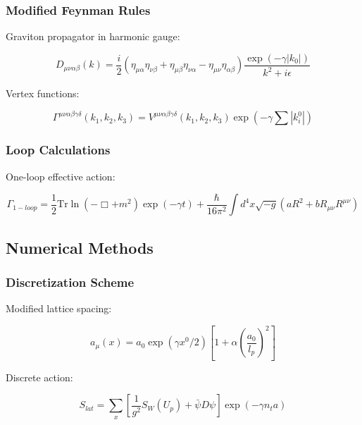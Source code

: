 \documentclass[12pt]{article}
\theoremstyle{plain}
\theoremstyle{definition}
\theoremstyle{remark}
\begin{document}
\subsubsection{Modified Feynman Rules}

Graviton propagator in harmonic gauge:

\begin{equation}
D_{\mu\nu\alpha\beta}(k) = \frac{i}{2}\left(\eta_{\mu\alpha}\eta_{\nu\beta} + \eta_{\mu\beta}\eta_{\nu\alpha} - \eta_{\mu\nu}\eta_{\alpha\beta}\right)\frac{\exp(-\gamma|k_0|)}{k^2 + i\epsilon}
\end{equation}

Vertex functions:

\begin{equation}
\Gamma^{\mu\nu\alpha\beta\gamma\delta}(k_1,k_2,k_3) = V^{\mu\nu\alpha\beta\gamma\delta}(k_1,k_2,k_3)\exp(-\gamma\sum|k_i^0|)
\end{equation}

\subsubsection{Loop Calculations}

One-loop effective action:

\begin{equation}
\Gamma_{1-loop} = \frac{1}{2}\text{Tr}\ln(-\Box + m^2)\exp(-\gamma t) + \frac{\hbar}{16\pi^2}\int d^4x\sqrt{-g}(aR^2 + bR_{\mu\nu}R^{\mu\nu})
\end{equation}

\subsection{Numerical Methods}

\subsubsection{Discretization Scheme}

Modified lattice spacing:

\begin{equation}
a_{\mu}(x) = a_0\exp(\gamma x^0/2)\left[1 + \alpha\left(\frac{a_0}{l_p}\right)^2\right]
\end{equation}

Discrete action:

\begin{equation}
S_{lat} = \sum_x\left[\frac{1}{g^2}S_W(U_p) + \bar{\psi}D\psi\right]\exp(-\gamma n_ta)
\end{equation}
\end{document}
